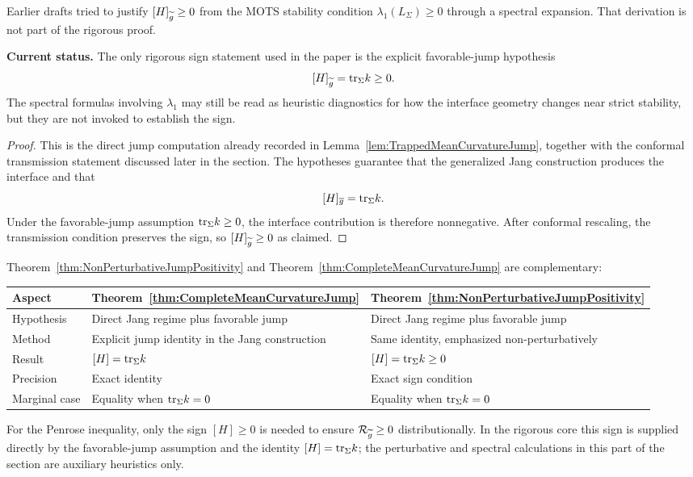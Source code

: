 \begin{remark}\label{rem:SpectralRobustness}
Earlier drafts tried to justify $[H]_{\widetilde{g}} \ge 0$ from the MOTS stability condition $\lambda_1(L_\Sigma) \ge 0$ through a spectral expansion. That derivation is not part of the rigorous proof.

\textbf{Current status.} The only rigorous sign statement used in the paper is the explicit favorable-jump hypothesis
\[
    [H]_{\widetilde{g}} = \mathrm{tr}_\Sigma k \ge 0.
\]
The spectral formulas involving $\lambda_1$ may still be read as heuristic diagnostics for how the interface geometry changes near strict stability, but they are not invoked to establish the sign.
\end{remark}

\begin{proof}
This is the direct jump computation already recorded in Lemma~\ref{lem:TrappedMeanCurvatureJump}, together with the conformal transmission statement discussed later in the section. The hypotheses guarantee that the generalized Jang construction produces the interface and that
\[
    [H]_{\overline{g}}=\mathrm{tr}_\Sigma k.
\]
Under the favorable-jump assumption $\mathrm{tr}_\Sigma k\ge 0$, the interface contribution is therefore nonnegative. After conformal rescaling, the transmission condition preserves the sign, so $[H]_{\widetilde{g}}\ge 0$ as claimed.
\end{proof}

\begin{remark}\label{rem:PerturbativeComparison}
Theorem~\ref{thm:NonPerturbativeJumpPositivity} and Theorem~\ref{thm:CompleteMeanCurvatureJump} are complementary:

\begin{center}
\small
\begin{tabular}{p{}p{}p{}}
\toprule
\textbf{Aspect} & \textbf{Theorem~\ref{thm:CompleteMeanCurvatureJump}} & \textbf{Theorem~\ref{thm:NonPerturbativeJumpPositivity}} \\
\midrule
Hypothesis & Direct Jang regime plus favorable jump & Direct Jang regime plus favorable jump \\
Method & Explicit jump identity in the Jang construction & Same identity, emphasized non-perturbatively \\
Result & $[H] = \mathrm{tr}_\Sigma k$ & $[H] = \mathrm{tr}_\Sigma k \ge 0$ \\
Precision & Exact identity & Exact sign condition \\
Marginal case & Equality when $\mathrm{tr}_\Sigma k = 0$ & Equality when $\mathrm{tr}_\Sigma k = 0$ \\
\bottomrule
\end{tabular}
\end{center}

For the Penrose inequality, only the sign $[H] \ge 0$ is needed to ensure $\mathcal{R}_{\widetilde{g}} \ge 0$ distributionally. In the rigorous core this sign is supplied directly by the favorable-jump assumption and the identity $[H]=\mathrm{tr}_\Sigma k$; the perturbative and spectral calculations in this part of the section are auxiliary heuristics only.
\end{remark}

